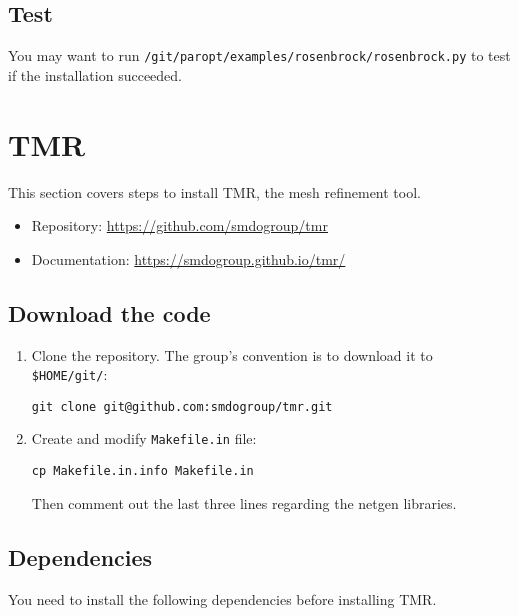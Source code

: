 \documentclass{article}
\begin{document}
\subsection{Test}

You may want to run \texttt{\texttildelow/git/paropt/examples/rosenbrock/rosenbrock.py} to test if the installation succeeded.

\section{TMR}

This section covers steps to install TMR, the mesh refinement tool.

\begin{itemize}
    \item Repository: \href{https://github.com/smdogroup/tmr}{https://github.com/smdogroup/tmr}
    \item Documentation: \href{https://smdogroup.github.io/tmr/}{https://smdogroup.github.io/tmr/}
\end{itemize}

\subsection{Download the code}

\begin{enumerate}
    \item
    Clone the repository. The group's convention is to download it to \texttt{\$HOME/git/}:

    \texttt{git clone git@github.com:smdogroup/tmr.git}

    \item
    Create and modify \texttt{Makefile.in} file:

    \texttt{cp Makefile.in.info Makefile.in}

    Then comment out the last three lines regarding the netgen libraries.

\end{enumerate}

\subsection{Dependencies}

You need to install the following dependencies before installing TMR.
\end{document}
